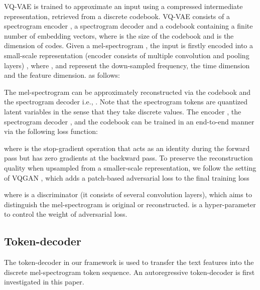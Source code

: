 \documentclass[lettersize,journal]{IEEEtran}
\begin{document}
VQ-VAE is trained to approximate an input using a compressed intermediate representation, retrieved from a discrete codebook. VQ-VAE consists of a spectrogram encoder , a spectrogram decoder  and a codebook  containing a finite number of embedding vectors, where  is the size of the codebook and  is the dimension of codes. Given a mel-spectrogram , the input  is firstly encoded into a small-scale representation (encoder  consists of multiple convolution and pooling layers) , where ,  and  represent the {\color{black}down-sampled frequency, the time dimension and the feature dimension.} 
{\color{black}{Then we use a vector quantizer  which maps each time-frequency vector  into its closest codebook entry  to obtain a discrete spectrogram token sequence } as follows:}

The mel-spectrogram can be {\color{black}approximately} reconstructed via the codebook  and the spectrogram decoder i.e., . Note that the spectrogram tokens are quantized latent variables in the sense that they take discrete values. The encoder , the spectrogram decoder , and the codebook  can be trained {\color{black} in an end-to-end manner} via the following loss function:

where  is the stop-gradient operation that acts as an identity during the forward pass but has zero gradients at the backward pass. To preserve the reconstruction quality when upsampled from a smaller-scale representation, we follow the setting of VQGAN \cite{esser2021taming}, which adds a patch-based adversarial loss \cite{isola2017image} to the final training loss

where  is a discriminator (it consists of several convolution layers), which aims to distinguish the mel-spectrogram is original or reconstructed.  is a hyper-parameter to control the weight of adversarial loss.
\subsection{Token-decoder} \label{sec:autoregressive model}
The token-decoder in our framework is used to transfer the text features into the discrete mel-spectrogram token sequence. An autoregressive token-decoder is first investigated in this paper.
\end{document}
